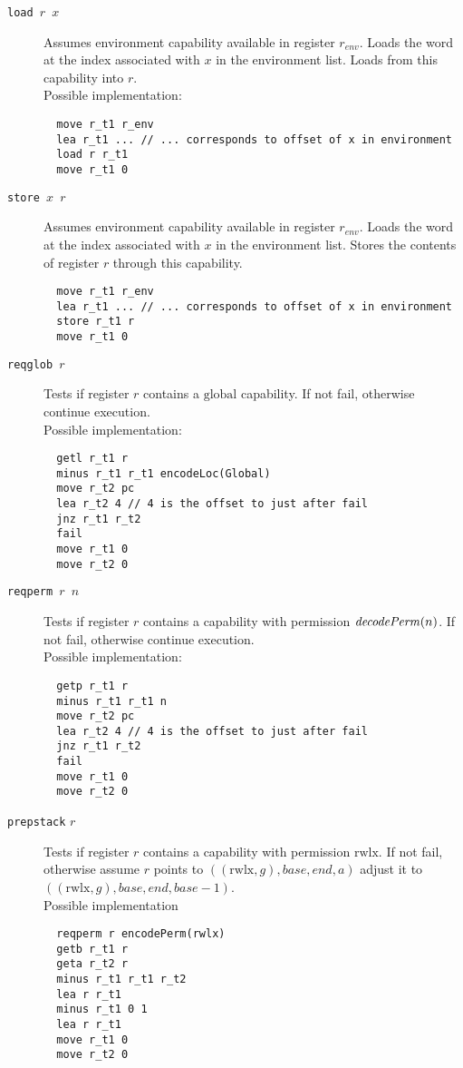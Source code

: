 \documentclass[a4paper]{article}
\newcommand\lau[1]{{\color{purple} \sf \footnotesize {LS: #1}}\\}
\renewcommand\lau[1]{}
\newcommand{\var}[1]{\mathit{#1}}
\newcommand{\gl}{\var{g}}
\newcommand{\addr}{\var{a}}
\newcommand{\start}{\var{base}}
\newcommand{\addrend}{\var{end}}
\newcommand{\plainfun}[2]{
  \ifthenelse{\equal{#2}{}}
  {\mathit{#1}}
  {\mathit{#1}(#2)}
}
\newcommand{\decodePerm}[1]{\plainfun{decodePerm}{#1}}
\newcommand{\plainperm}[1]{\mathrm{#1}}
\newcommand{\rwlx}{\plainperm{rwlx}}
\newcommand{\glob}{\plainperm{global}}
\begin{document}
\begin{description}
\item[\texttt{load $r$ $x$}] Assumes environment capability available in register $r_{\var{env}}$. Loads the word at the index associated with $x$ in the environment list. Loads from this capability into $r$.\\
Possible implementation:
\begin{lstlisting}
  move r_t1 r_env
  lea r_t1 ... // ... corresponds to offset of x in environment
  load r r_t1
  move r_t1 0
\end{lstlisting}
\item[\texttt{store $x$ $r$}] Assumes environment capability available in register $r_{\var{env}}$. Loads the word at the index associated with $x$ in the environment list. Stores the contents of register $r$ through this capability.
\begin{lstlisting}
  move r_t1 r_env
  lea r_t1 ... // ... corresponds to offset of x in environment
  store r_t1 r
  move r_t1 0
\end{lstlisting}
\item[\texttt{reqglob $r$}] Tests if register $r$ contains a $\glob$ capability. If not fail, otherwise continue execution.\\
Possible implementation:
\begin{lstlisting}
  getl r_t1 r
  minus r_t1 r_t1 encodeLoc(Global)
  move r_t2 pc
  lea r_t2 4 // 4 is the offset to just after fail
  jnz r_t1 r_t2
  fail
  move r_t1 0
  move r_t2 0
\end{lstlisting}
\item[\texttt{reqperm $r$ $n$}] Tests if register $r$ contains a capability with permission $\decodePerm{n}$. If not fail, otherwise continue execution.\\
Possible implementation:
\begin{lstlisting}
  getp r_t1 r
  minus r_t1 r_t1 n
  move r_t2 pc
  lea r_t2 4 // 4 is the offset to just after fail
  jnz r_t1 r_t2
  fail
  move r_t1 0
  move r_t2 0
\end{lstlisting}

\item[\texttt{prepstack} $r$] Tests if register $r$ contains a capability with permission $\rwlx$. If not fail, otherwise assume $r$ points to $((\rwlx,\gl),\start,\addrend,\addr)$ adjust it to $((\rwlx,\gl),\start,\addrend,\start - 1)$.\\
Possible implementation
\begin{lstlisting}
  reqperm r encodePerm(rwlx)
  getb r_t1 r
  geta r_t2 r
  minus r_t1 r_t1 r_t2
  lea r r_t1
  minus r_t1 0 1
  lea r r_t1
  move r_t1 0
  move r_t2 0
\end{lstlisting}
  \lau{What if the stack starts at address 0? Changing the stack convention to always point at the first free cell will get rid of this problem (because our memory us uncapped.)}\lau{Seeing as we did not change this: It does not give a problem as such because this would cause the machine to fail which is considered acceptable. It would also be possible to make a more ``sofisticated'' implementation that special cases on this and simply throws the first address away.}
\end{description}
\end{document}
